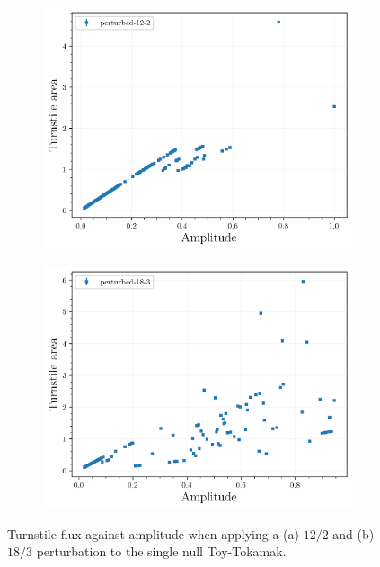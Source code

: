 \begin{figure}[H]
    \centering
    \begin{subfigure}{0.49\textwidth}
        \centering
        \includegraphics[width=\textwidth]{images/amplitudescan/turnstile_area_12_2.png}
        \caption{}
        \label{fig:scan-12-2}
    \end{subfigure}
    \begin{subfigure}{0.49\textwidth}
        \centering
        \includegraphics[width=\textwidth]{images/amplitudescan/turnstile_area_18_3.png}
        \caption{}
        \label{fig:scan-18-3}
    \end{subfigure}
    \caption{Turnstile flux against amplitude when applying a (a) $12/2$ and (b) $18/3$ perturbation to the single null Toy-Tokamak.}
    \label{fig:amp-scan}
\end{figure}


